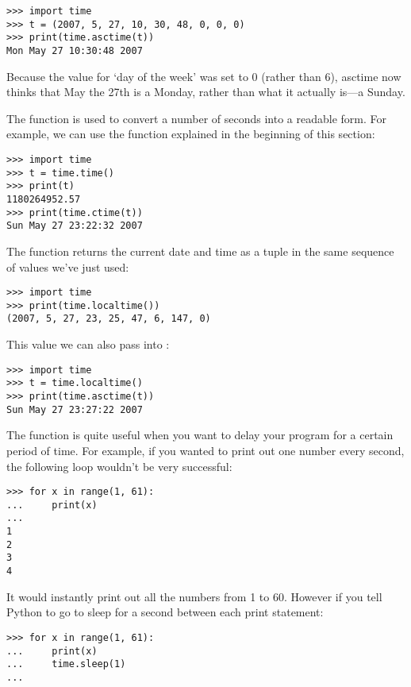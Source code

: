 \begin{Verbatim}[frame=single]
>>> import time
>>> t = (2007, 5, 27, 10, 30, 48, 0, 0, 0)
>>> print(time.asctime(t))
Mon May 27 10:30:48 2007
\end{Verbatim}

\noindent
Because the value for `day of the week' was set to 0 (rather than 6), asctime now thinks that May the 27th is a Monday, rather than what it actually is---a Sunday.

The function  is used to convert a number of seconds into a readable form.  For example, we can use the  function explained in the beginning of this section:

\begin{Verbatim}[frame=single]
>>> import time
>>> t = time.time()
>>> print(t)
1180264952.57
>>> print(time.ctime(t))
Sun May 27 23:22:32 2007
\end{Verbatim}

\noindent
The function  returns the current date and time as a tuple in the same sequence of values we've just used:

\begin{Verbatim}[frame=single]
>>> import time
>>> print(time.localtime())
(2007, 5, 27, 23, 25, 47, 6, 147, 0)
\end{Verbatim}

\noindent
This value we can also pass into :

\begin{Verbatim}[frame=single]
>>> import time
>>> t = time.localtime()
>>> print(time.asctime(t))
Sun May 27 23:27:22 2007
\end{Verbatim}

\noindent
The function  is quite useful when you want to delay your program for a certain period of time.  For example, if you wanted to print out one number every second, the following loop wouldn't be very successful:

\begin{Verbatim}[frame=single]
>>> for x in range(1, 61):
...     print(x)
...
1
2
3
4
\end{Verbatim}

It would instantly print out all the numbers from 1 to 60. However if you tell Python to go to sleep for a second between each print statement:

\begin{Verbatim}[frame=single]
>>> for x in range(1, 61):
...     print(x)
...     time.sleep(1)
...
\end{Verbatim}

